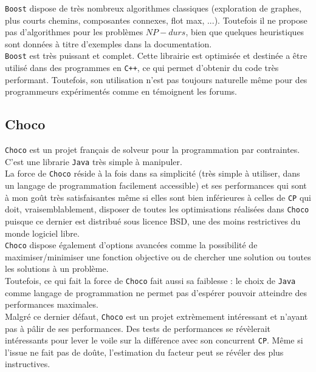 \verb?Boost? dispose de très nombreux algorithmes classiques (exploration de graphes,
plus courts chemins, composantes connexes, flot max, ...).
Toutefois il ne propose pas d'algorithmes pour les problèmes $NP-durs$, bien que quelques
heuristiques sont données à titre d'exemples dans la documentation.\\

\verb?Boost? est très puissant et complet. Cette librairie est optimisée et destinée
a être utilisé dans des programmes en \verb?C++?, ce qui permet d'obtenir du code
très performant. Toutefois, son utilisation n'est pas toujours naturelle même pour des
programmeurs expérimentés comme en témoignent les forums.

\subsection{Choco}
\verb?Choco? est un projet français de
solveur pour la programmation par contraintes.
C'est une librarie \verb?Java? très simple à manipuler.\\

La force de \verb?Choco? réside à la fois dans sa simplicité (très simple à utiliser,
dans un langage de programmation facilement accessible) et ses performances
qui sont à mon goût très satisfaisantes même si elles sont bien inférieures à celles de \verb?CP?
qui doit, vraisemblablement, disposer de toutes les optimisations réalisées dans \verb?Choco?
puisque ce dernier est distribué sous licence BSD, une des moins restrictives du monde logiciel libre.\\

\verb?Choco? dispose également d'options avancées comme la possibilité de maximiser/minimiser une
fonction objective ou de chercher une solution ou toutes les solutions à un problème.\\

Toutefois, ce qui fait la force de \verb?Choco? fait aussi sa faiblesse : le choix de \verb?Java?
comme langage de programmation ne permet pas d'espérer pouvoir atteindre des performances maximales.\\

Malgré ce dernier défaut, \verb?Choco? est un projet extrèmement intéressant et n'ayant pas à
pâlir de ses performances. Des tests de performances se révèlerait intéressants pour lever le voile
sur la différence avec son concurrent \verb?CP?. Même si l'issue ne fait pas de doûte, l'estimation
du facteur peut se révéler des plus instructives.

